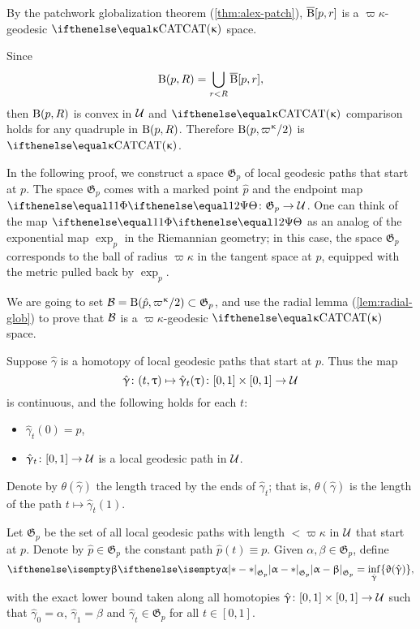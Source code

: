 By the patchwork globalization theorem (\ref{thm:alex-patch}), 
$\overline{\mathrm{B}}{}[ p,r]$ is a $\varpi\kappa$-geodesic $\CAT\kappa$ space.

Since
\[\mathrm{B}{}( p,R)
=
\bigcup_{r < R}\overline{\mathrm{B}}{}[ p,r],\] 
then $\mathrm{B}{}( p,R)$ is convex in $\mathcal{U}$ and 
$\CAT\kappa$ comparison holds  for any quadruple in $\mathrm{B}{}( p,R)$.
Therefore $\oBall( p,\varpi\kappa/2)$ is $\CAT\kappa$.
\qeds


In the following proof, we construct a space $\mathfrak{G}_p$ of  local geodesic paths that start at $p$.
The space $\mathfrak{G}_p$ comes with 
a marked point $\hat p$ 
and the endpoint map $\map\:\mathfrak{G}_p\to\spc{U}$.
One can think of
the map $\map$ as an analog of the exponential map $\exp_p$ in the Riemannian geometry;
in this case,
the space $\mathfrak{G}_p$ corresponds to the ball of radius $\varpi\kappa$ in the tangent space at $p$, equipped with the metric pulled back by $\exp_p$.

We are going to set $\spc{B}=\oBall(\hat p,\varpi\kappa/2)\subset \mathfrak{G}_p$,
and use the radial lemma (\ref{lem:radial-glob}) to prove that $\mathcal{B}$ is a $\varpi\kappa$-geodesic $\CAT\kappa$ space.

Suppose $\hat\gamma$ is a homotopy of local geodesic paths that start at $p$.  Thus the map 
\[\hat\gamma\:(t,\tau)\mapsto\hat\gamma_t(\tau)\:[0,1]\times[0,1]\to\spc{U}\] 
is continuous,
and the following holds for each $t$:
\begin{itemize}
\item $\hat\gamma_t(0)=p$,
\item $\hat\gamma_t\:[0,1]\to\spc{U}$ is a local geodesic path in $\mathcal{U}$.
\end{itemize}

Denote by $\theta(\hat\gamma)$ the length traced by the ends of $\hat\gamma_t$;
that is, $\theta(\hat\gamma)$ is the length of the path $t\mapsto\hat\gamma_t(1)$.

Let $\mathfrak{G}_p$ be the set of all local geodesic paths 
with length $<\varpi\kappa$ in $\mathcal{U}$ that start at $p$.
Denote by $\hat p\in \mathfrak{G}_p$ the constant path $\hat p(t)\equiv p$.
Given $\alpha,\beta\in \mathfrak{G}_p$, define
\[
\dist{\alpha}{\beta}{\mathfrak{G}_p}
=
\inf_{\hat\gamma} \{\theta(\hat\gamma)\},\]
with the exact lower bound taken along all homotopies 
$\hat\gamma\:[0,1]\times[0,1]\to\spc{U}$ 
such that 
$\hat\gamma_0=\alpha$, 
$\hat\gamma_1=\beta$ 
and $\hat\gamma_t\in \mathfrak{G}_p$ for all $t\in[0,1]$.

